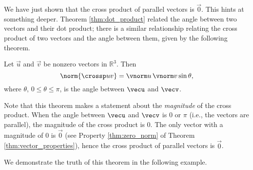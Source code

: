 We have just shown that the cross product of parallel vectors is $\vec 0$. This hints at something deeper. Theorem \ref{thm:dot_product} related the angle between two vectors and their dot product; there is a similar relationship relating the cross product of two vectors and the angle between them, given by the following theorem.

{Let $\vec u$ and $\vec v$ be nonzero vectors in $\mathbb{R}^3$. Then
$$\norm{\crossp uv} = \vnorm u\, \vnorm v \sin\theta,$$
where $\theta$, $0\leq \theta \leq \pi$, is the angle between $\vecu$ and $\vecv$.
}

Note that this theorem makes a statement about the \emph{magnitude} of the cross product. When the angle between $\vecu$ and $\vecv$ is 0 or $\pi$ (i.e., the vectors are parallel), the magnitude of the cross product is 0. The only vector with a magnitude of 0 is $\vec 0$ (see Property \ref{thm:zero_norm} of Theorem \ref{thm:vector_properties}), hence the cross product of  parallel vectors is $\vec 0$.

We demonstrate the truth of this theorem in the following example.\\

